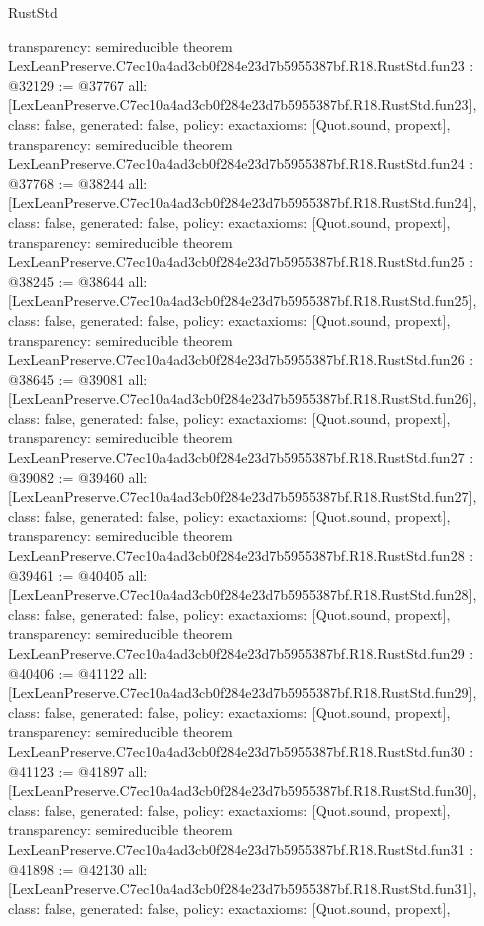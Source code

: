 \begin{lexlean}{RustStd}
\begin{coremodule}
{  transparency: semireducible
}
theorem LexLeanPreserve.C7ec10a4ad3cb0f284e23d7b5955387bf.R18.RustStd.fun23 : @32129 := @37767 {
  all: [LexLeanPreserve.C7ec10a4ad3cb0f284e23d7b5955387bf.R18.RustStd.fun23],
  class: false,
  generated: false,
  policy: exact{axioms: [Quot.sound, propext]},
  transparency: semireducible
}
theorem LexLeanPreserve.C7ec10a4ad3cb0f284e23d7b5955387bf.R18.RustStd.fun24 : @37768 := @38244 {
  all: [LexLeanPreserve.C7ec10a4ad3cb0f284e23d7b5955387bf.R18.RustStd.fun24],
  class: false,
  generated: false,
  policy: exact{axioms: [Quot.sound, propext]},
  transparency: semireducible
}
theorem LexLeanPreserve.C7ec10a4ad3cb0f284e23d7b5955387bf.R18.RustStd.fun25 : @38245 := @38644 {
  all: [LexLeanPreserve.C7ec10a4ad3cb0f284e23d7b5955387bf.R18.RustStd.fun25],
  class: false,
  generated: false,
  policy: exact{axioms: [Quot.sound, propext]},
  transparency: semireducible
}
theorem LexLeanPreserve.C7ec10a4ad3cb0f284e23d7b5955387bf.R18.RustStd.fun26 : @38645 := @39081 {
  all: [LexLeanPreserve.C7ec10a4ad3cb0f284e23d7b5955387bf.R18.RustStd.fun26],
  class: false,
  generated: false,
  policy: exact{axioms: [Quot.sound, propext]},
  transparency: semireducible
}
theorem LexLeanPreserve.C7ec10a4ad3cb0f284e23d7b5955387bf.R18.RustStd.fun27 : @39082 := @39460 {
  all: [LexLeanPreserve.C7ec10a4ad3cb0f284e23d7b5955387bf.R18.RustStd.fun27],
  class: false,
  generated: false,
  policy: exact{axioms: [Quot.sound, propext]},
  transparency: semireducible
}
theorem LexLeanPreserve.C7ec10a4ad3cb0f284e23d7b5955387bf.R18.RustStd.fun28 : @39461 := @40405 {
  all: [LexLeanPreserve.C7ec10a4ad3cb0f284e23d7b5955387bf.R18.RustStd.fun28],
  class: false,
  generated: false,
  policy: exact{axioms: [Quot.sound, propext]},
  transparency: semireducible
}
theorem LexLeanPreserve.C7ec10a4ad3cb0f284e23d7b5955387bf.R18.RustStd.fun29 : @40406 := @41122 {
  all: [LexLeanPreserve.C7ec10a4ad3cb0f284e23d7b5955387bf.R18.RustStd.fun29],
  class: false,
  generated: false,
  policy: exact{axioms: [Quot.sound, propext]},
  transparency: semireducible
}
theorem LexLeanPreserve.C7ec10a4ad3cb0f284e23d7b5955387bf.R18.RustStd.fun30 : @41123 := @41897 {
  all: [LexLeanPreserve.C7ec10a4ad3cb0f284e23d7b5955387bf.R18.RustStd.fun30],
  class: false,
  generated: false,
  policy: exact{axioms: [Quot.sound, propext]},
  transparency: semireducible
}
theorem LexLeanPreserve.C7ec10a4ad3cb0f284e23d7b5955387bf.R18.RustStd.fun31 : @41898 := @42130 {
  all: [LexLeanPreserve.C7ec10a4ad3cb0f284e23d7b5955387bf.R18.RustStd.fun31],
  class: false,
  generated: false,
  policy: exact{axioms: [Quot.sound, propext]},
}
\end{coremodule}
\end{lexlean}
